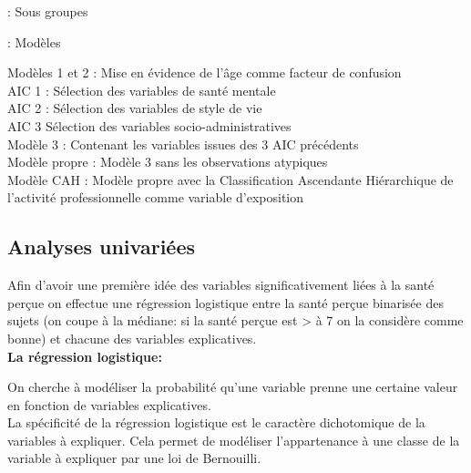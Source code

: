 \documentclass{book}
\begin{document}
\noindent
{} : Sous groupes\\

\noindent
{} : Modèles \\

\bigskip

\noindent
Modèles 1 et 2 : Mise en évidence de l'âge comme facteur de confusion\\

\bigskip
\noindent
AIC 1 : Sélection des variables de santé mentale\\

\bigskip
\noindent
AIC 2 : Sélection des variables de style de vie\\

\bigskip
\noindent
AIC 3 Sélection des variables socio-administratives\\

\bigskip
\noindent
Modèle 3 : Contenant les variables issues des 3 AIC précédents\\

\bigskip
\noindent
Modèle propre : Modèle 3 sans les observations atypiques\\

\bigskip
\noindent
Modèle CAH : Modèle propre avec la Classification Ascendante Hiérarchique de l'activité professionnelle comme variable d'exposition\\
\subsection{Analyses univariées}

\noindent
Afin d'avoir une première idée des variables significativement liées à la santé perçue on effectue une régression logistique entre la santé perçue binarisée des sujets (on coupe à la médiane: si la santé perçue est > à 7 on la considère comme bonne) et chacune des variables explicatives.\\


\bigskip
\noindent
\textbf{La régression logistique:}
\bigskip

\noindent
On cherche à modéliser la probabilité qu'une variable prenne une certaine valeur en fonction de variables explicatives.\\
La spécificité de la régression logistique est le caractère dichotomique de la variables à expliquer. Cela permet de modéliser l'appartenance à une classe de la variable à expliquer par une loi de Bernouilli.\\
\end{document}
